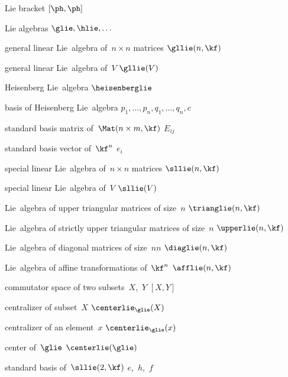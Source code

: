 
{Lie bracket}
{$[\ph, \ph]$}

{Lie algebras}
{$\glie, \hlie, \dotsc$}

{general linear Lie~algebra of~$n \times n$ matrices}
{$\gllie(n, \kf)$}

{general linear Lie~algebra of~$V$}
{$\gllie(V)$}

{Heisenberg Lie~algebra}
{$\heisenberglie$}

{basis of Heisenberg Lie~algebra}
{$p_1, \dotsc, p_n, q_1, \dotsc, q_n, c$}

{standard basis matrix of~$\Mat(n \times m, \kf)$}
{$E_{ij}$}

{standard basis vector of~$\kf^n$}
{$e_i$}

{special linear Lie~algebra of~$n \times n$ matrices}
{$\sllie(n, \kf)$}

{special linear Lie~algebra of~$V$}
{$\sllie(V)$}

{Lie~algebra of upper triangular matrices of size~$n$}
{$\trianglie(n, \kf)$}

{Lie~algebra of strictly upper triangular matrices of size~$n$}
{$\upperlie(n, \kf)$}

{Lie~algebra of diagonal matrices of size~$nn$}
{$\diaglie(n, \kf)$}

{Lie~algebra of affine transformations of~$\kf^n$}
{$\afflie(n, \kf)$}

{commutator space of two subsets~$X$,~$Y$}
{$[X, Y]$}

{centralizer of subset~$X$}
{$\centerlie_{\glie}(X)$}

{centralizer of an element~$x$}
{$\centerlie_{\glie}(x)$}

{center of~$\glie$}
{$\centerlie(\glie)$}

{standard basis of~$\sllie(2, \kf)$}
{$e$,~$h$,~$f$}

